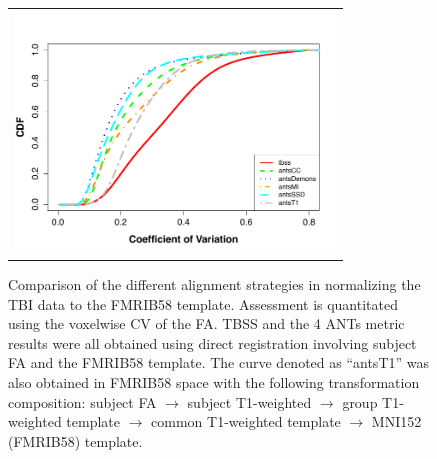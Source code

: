 \documentclass[final,5p,times,twocolumn]{elsarticle}
\begin{document}
\begin{figure}
  \begin{center}
\begin{tabular}{c}
  \includegraphics[width=85mm]{tbiCoV.pdf}
\end{tabular}
\caption{Comparison of the different alignment strategies in normalizing the TBI data to the FMRIB58 template.  Assessment is quantitated using the voxelwise CV of the FA.  TBSS and the 4 ANTs metric
results were all obtained using direct registration involving subject FA and the FMRIB58 template.  The curve denoted as ``antsT1'' was also obtained in FMRIB58 space with the following transformation composition: subject FA $\rightarrow$ subject T1-weighted $\rightarrow$ group T1-weighted template $\rightarrow$ 
common T1-weighted template $\rightarrow$ MNI152 (FMRIB58) template. }
\label{fig:tbi_cov}
\end{center}
\end{figure}
\end{document}
